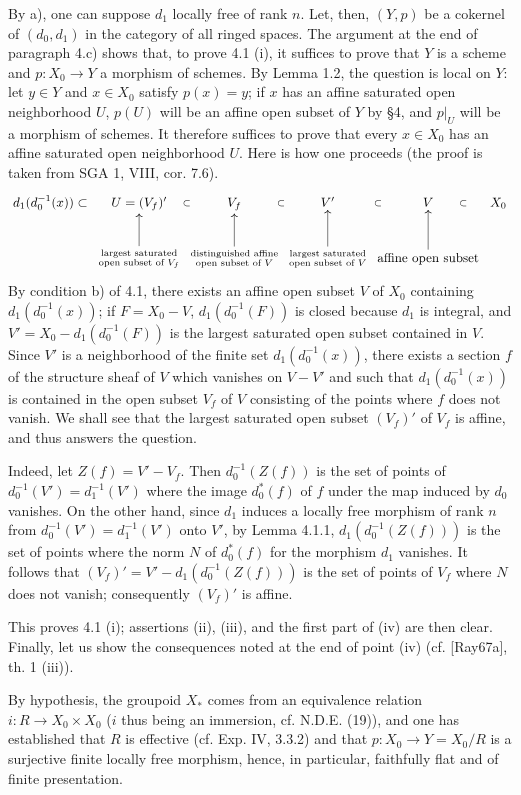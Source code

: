 By a), one can suppose $d_1$ locally free of rank $n$. Let, then, $(Y,p)$ be a cokernel of $(d_0,d_1)$ in the category of all ringed spaces. The argument at the end of paragraph 4.c) shows that, to prove 4.1 (i), it suffices to prove that $Y$ is a scheme and $p:X_0\to Y$ a morphism of schemes. By Lemma 1.2, the question is local on $Y$: let $y\in Y$ and $x\in X_0$ satisfy $p(x)=y$; if $x$ has an affine saturated open neighborhood $U$, $p(U)$ will be an affine open subset of $Y$ by §4, and $p|_U$ will be a morphism of schemes. It therefore suffices to prove that every $x\in X_0$ has an affine saturated open neighborhood $U$. Here is how one proceeds (the proof is taken from SGA 1, VIII, cor. 7.6).
\[
\xymatrix@C=.25em{d_1(d_0^{-1}(x))\subset&U=(V_f)'\ar@{}[r]|{\subset}&V_f\ar@{}[r]|{\subset}&V'\ar@{}[r]|{\subset}&V\ar@{}[r]|{\subset}&X_0\\&\substack{\text{largest saturated}\\\text{open subset of }V_f}\ar[u]&\substack{\text{distinguished affine}\\\text{open subset of }V}\ar[u]&\substack{\text{largest saturated}\\\text{open subset of }V}\ar[u]&\text{affine open subset}\ar[u]&}
\]
By condition b) of 4.1, there exists an affine open subset $V$ of $X_0$ containing $d_1(d_0^{-1}(x))$; if $F=X_0-V$, $d_1(d_0^{-1}(F))$ is closed because $d_1$ is integral, and $V'=X_0-d_1(d_0^{-1}(F))$ is the largest saturated open subset contained in $V$. Since $V'$ is a neighborhood of the finite set $d_1(d_0^{-1}(x))$, there exists a section $f$ of the structure sheaf of $V$ which vanishes on $V-V'$ and such that $d_1(d_0^{-1}(x))$ is contained in the open subset $V_f$ of $V$ consisting of the points where $f$ does not vanish. We shall see that the largest saturated open subset $(V_f)'$ of $V_f$ is affine, and thus answers the question.

Indeed, let $Z(f)=V'-V_f$. Then $d_0^{-1}(Z(f))$ is the set of points of $d_0^{-1}(V')=d_1^{-1}(V')$ where the image $d_0^*(f)$ of $f$ under the map induced by $d_0$ vanishes. On the other hand, since $d_1$ induces a locally free morphism of rank $n$ from $d_0^{-1}(V')=d_1^{-1}(V')$ onto $V'$, by Lemma 4.1.1, $d_1(d_0^{-1}(Z(f)))$ is the set of points where the norm $N$ of $d_0^*(f)$ for the morphism $d_1$ vanishes. It follows that $(V_f)'=V'-d_1(d_0^{-1}(Z(f)))$ is the set of points of $V_f$ where $N$ does not vanish; consequently $(V_f)'$ is affine.

This proves 4.1 (i); assertions (ii), (iii), and the first part of (iv) are then clear. Finally, let us show the consequences noted at the end of point (iv) (cf. [Ray67a], th. 1 (iii)).

By hypothesis, the groupoid $X_*$ comes from an equivalence relation $i:R\to X_0\times X_0$ ($i$ thus being an immersion, cf. N.D.E. (19)), and one has established that $R$ is effective (cf. Exp. IV, 3.3.2) and that $p:X_0\to Y=X_0/R$ is a surjective finite locally free morphism, hence, in particular, faithfully flat and of finite presentation.

